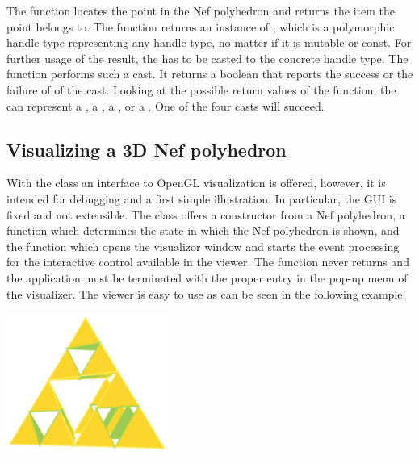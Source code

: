 The  function locates the point  in the
Nef polyhedron and returns the item the point belongs to. The
 function returns an instance of ,
which is a polymorphic handle type representing any handle type, no
matter if it is mutable or const.  For further usage of the result,
the  has to be casted to the concrete handle type.
The  function performs such a cast. It returns a
boolean that reports the success or the failure of of the cast.
Looking at the possible return values of the  function,
the  can represent a , a
, a , or a
. One of the four casts will succeed.


\subsection{Visualizing a 3D Nef polyhedron}

With the  class an interface to OpenGL
visualization is offered, however, it is intended for debugging and a
first simple illustration. In particular, the GUI is fixed and not
extensible. The  class offers a
constructor from a Nef polyhedron, a  function  which
determines the state in which the Nef polyhedron is shown, and the
  function which opens the visualizor
window and starts the event processing for the interactive control
available in the viewer. The   function
never returns and the application must be terminated with the proper
entry in the pop-up menu of the visualizer. The viewer is easy to use
as can be seen in the following example.

\begin{ccTexOnly}
    \begin{center}
      \parbox{0.4\textwidth}{%
          \includegraphics[width=0.4\textwidth]{Nef_3/fig/visualization_SNC}%
      }
    \end{center}
\end{ccTexOnly}

